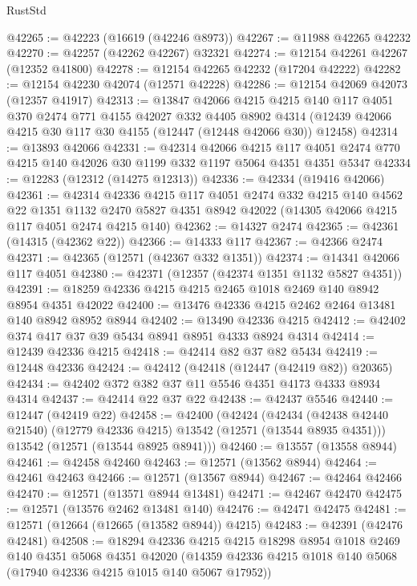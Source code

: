 \begin{lexlean}{RustStd}
\begin{coremodule}
@42265 := @42223 (@16619 (@42246 @8973))
@42267 := @11988 @42265 @42232
@42270 := @42257 (@42262 @42267) @32321
@42274 := @12154 @42261 @42267 (@12352 @41800)
@42278 := @12154 @42265 @42232 (@17204 @42222)
@42282 := @12154 @42230 @42074 (@12571 @42228)
@42286 := @12154 @42069 @42073 (@12357 @41917)
@42313 := @13847
    @42066
    @4215
    @4215
    @140
    @117
    @4051
    @370
    @2474
    @771
    @4155
    @42027
    @332
    @4405
    @8902
    @4314
    (@12439 @42066 @4215 @30 @117 @30 @4155 (@12447 (@12448 @42066 @30)) @12458)
@42314 := @13893 @42066
@42331 := @42314
    @42066
    @4215
    @117
    @4051
    @2474
    @770
    @4215
    @140
    @42026
    @30
    @1199
    @332
    @1197
    @5064
    @4351
    @4351
    @5347
@42334 := @12283 (@12312 (@14275 @12313))
@42336 := @42334 (@19416 @42066)
@42361 := @42314
    @42336
    @4215
    @117
    @4051
    @2474
    @332
    @4215
    @140
    @4562
    @22
    @1351
    @1132
    @2470
    @5827
    @4351
    @8942
    @42022
    (@14305 @42066 @4215 @117 @4051 @2474 @4215 @140)
@42362 := @14327 @2474
@42365 := @42361 (@14315 (@42362 @22))
@42366 := @14333 @117
@42367 := @42366 @2474
@42371 := @42365 (@12571 (@42367 @332 @1351))
@42374 := @14341 @42066 @117 @4051
@42380 := @42371 (@12357 (@42374 @1351 @1132 @5827 @4351))
@42391 := @18259 @42336 @4215 @4215 @2465 @1018 @2469 @140 @8942 @8954 @4351 @42022
@42400 := @13476 @42336 @4215 @2462 @2464 @13481 @140 @8942 @8952 @8944
@42402 := @13490 @42336 @4215
@42412 := @42402 @374 @417 @37 @39 @5434 @8941 @8951 @4333 @8924 @4314
@42414 := @12439 @42336 @4215
@42418 := @42414 @82 @37 @82 @5434
@42419 := @12448 @42336
@42424 := @42412 (@42418 (@12447 (@42419 @82)) @20365)
@42434 := @42402 @372 @382 @37 @11 @5546 @4351 @4173 @4333 @8934 @4314
@42437 := @42414 @22 @37 @22
@42438 := @42437 @5546
@42440 := @12447 (@42419 @22)
@42458 := @42400
    (@42424
      (@42434 (@42438 @42440 @21540) (@12779 @42336 @4215) @13542 (@12571 (@13544 @8935 @4351)))
      @13542
      (@12571 (@13544 @8925 @8941)))
@42460 := @13557 (@13558 @8944)
@42461 := @42458 @42460
@42463 := @12571 (@13562 @8944)
@42464 := @42461 @42463
@42466 := @12571 (@13567 @8944)
@42467 := @42464 @42466
@42470 := @12571 (@13571 @8944 @13481)
@42471 := @42467 @42470
@42475 := @12571 (@13576 @2462 @13481 @140)
@42476 := @42471 @42475
@42481 := @12571 (@12664 (@12665 (@13582 @8944)) @4215)
@42483 := @42391 (@42476 @42481)
@42508 := @18294
    @42336
    @4215
    @4215
    @18298
    @8954
    @1018
    @2469
    @140
    @4351
    @5068
    @4351
    @42020
    (@14359 @42336 @4215 @1018 @140 @5068 (@17940 @42336 @4215 @1015 @140 @5067 @17952))

\end{coremodule}
\end{lexlean}
